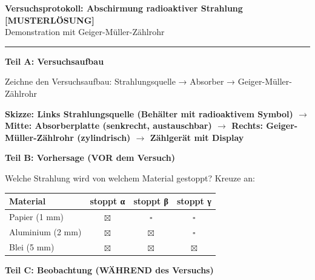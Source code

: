 \documentclass[10pt, a4paper]{article}
\newcommand{\fachfarbe}{physik}
\newcommand{\lsg}[1]{\textcolor{loesung}{\textbf{#1}}}
\newcommand{\abschnitt}[1]{%
    \vspace{8pt}\noindent\textbf{\textcolor{\fachfarbe}{#1}}\vspace{4pt}
}
\begin{document}

\newpage

\begin{center}
{\large\bfseries Versuchsprotokoll: Abschirmung radioaktiver Strahlung \textcolor{loesung}{[MUSTERLÖSUNG]}}\\[2pt]
{\small\textcolor{grau}{Demonstration mit Geiger-Müller-Zählrohr}}
\end{center}
\vspace{-2pt}\hrule\vspace{12pt}

\abschnitt{Teil A: Versuchsaufbau}

\begin{merksatz}
Zeichne den Versuchsaufbau: Strahlungsquelle → Absorber → Geiger-Müller-Zählrohr

\vspace{6pt}
\lsg{Skizze: Links Strahlungsquelle (Behälter mit radioaktivem Symbol) $\rightarrow$ Mitte: Absorberplatte (senkrecht, austauschbar) $\rightarrow$ Rechts: Geiger-Müller-Zählrohr (zylindrisch) $\rightarrow$ Zählgerät mit Display}
\vspace{40pt}
\end{merksatz}

\vspace{8pt}

\abschnitt{Teil B: Vorhersage (VOR dem Versuch)}

Welche Strahlung wird von welchem Material gestoppt? Kreuze an:

\vspace{6pt}

\begin{tabular}{|l|c|c|c|}
\hline
\textbf{Material} & \textbf{stoppt α} & \textbf{stoppt β} & \textbf{stoppt γ} \\
\hline
Papier (1 mm) & \lsg{$\boxtimes$} & $\square$ & $\square$ \\
\hline
Aluminium (2 mm) & \lsg{$\boxtimes$} & \lsg{$\boxtimes$} & $\square$ \\
\hline
Blei (5 mm) & \lsg{$\boxtimes$} & \lsg{$\boxtimes$} & \lsg{$\boxtimes$} \\
\hline
\end{tabular}

\vspace{12pt}

\abschnitt{Teil C: Beobachtung (WÄHREND des Versuchs)}
\end{document}
